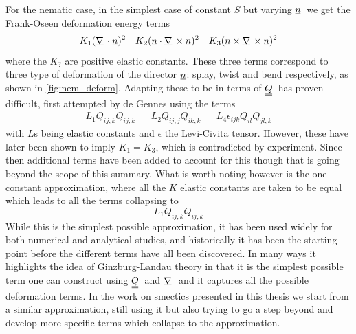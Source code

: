 \documentclass[12pt]{article}
\newcommand{\suf}[2]{\stackunder[0.5pt]{\stackunder[1pt]{\ensuremath{#1}}{\rule{\widthof{\ensuremath{#2}}*\real{0.9}}{.1ex}}}{}}
\newcommand{\duf}[2]{\stackunder[0.5pt]{\stackunder[0.8pt]{\stackunder[1pt]{\ensuremath{#1}}{\rule{\widthof{\ensuremath{#2}}*\real{0.9}}{.1ex}}}{\rule{\widthof{\ensuremath{#2}}*\real{0.9}}{.1ex}}}{}}
\newcommand{\su}[1]{\suf{#1}{#1}}
\newcommand{\du}[1]{\duf{#1}{#1}}
\newcommand{\mgrad}{\ensuremath{\suf{\nabla}{K}\,}}
\newcommand{\QQ}{\ensuremath{\du{Q}}}
\newcommand{\nn}{\ensuremath{\su{n}}}
\begin{document}
        For the nematic case, in the simplest case of constant $S$ but varying \nn\ we get the Frank-Oseen deformation energy terms\cite{brayTheoryPhaseOrdering1993,frankLiquidCrystalsTheory1958,gennesPhysicsLiquidCrystals1995}
        \begin{align}
            K_1 (\mgrad \cdot \su{n})^2 && K_2 (\su{n} \cdot \mgrad \times \su{n})^2 && K_3 (\su{n} \times \mgrad \times \su{n})^2
        \end{align}
        where the $K_?$ are positive elastic constants.
        These three terms correspond to three type of deformation of the director \nn: splay, twist and bend respectively, as shown in \cref{fig:nem_deform}.
        Adapting these to be in terms of \QQ\ has proven difficult, first attempted by de Gennes\cite{gennesPhysicsLiquidCrystals1995} using the terms
        \begin{align}
            L_1Q_{ij,k}Q_{ij,k} && L_2Q_{ij,j}Q_{ik,k} && L_4\epsilon_{ijk}Q_{il}Q_{jl,k}
        \end{align}
        with $L$s being elastic constants and $\epsilon$ the Levi-Civita tensor.
        However, these have later been shown to imply $K_1 = K_3$\cite{lubenskyMolecularDescriptionNematic1970}, which is contradicted by experiment.
        Since then additional terms have been added to account for this\cite{longaExtensionLandauGinzburgdeGennes1987} though that is going beyond the scope of this summary.
        What is worth noting however is the one constant approximation, where all the $K$ elastic constants are taken to be equal which leads to all the terms collapsing to
        \begin{equation}
            L_1 Q_{ij,k}Q_{ij,k}
        \end{equation}
        While this is the simplest possible approximation, it has been used widely for both numerical and analytical studies, and historically it has been the starting point before the different terms have all been discovered.
        In many ways it highlights the idea of Ginzburg-Landau theory in that it is the simplest possible term one can construct using \QQ\ and \mgrad\ and it captures all the possible deformation terms.
        In the work on smectics presented in this thesis we start from a similar approximation, still using it but also trying to go a step beyond and develop more specific terms which collapse to the approximation.
\end{document}
